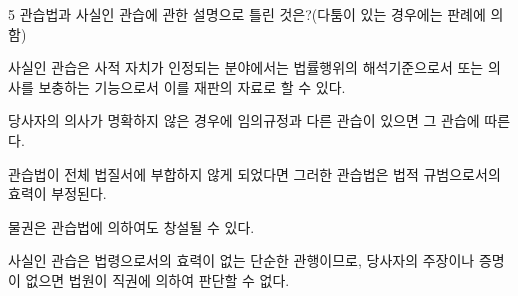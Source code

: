 \begin{question}{5}
관습법과 사실인 관습에 관한 설명으로 틀린 것은?(다툼이 있는 경우에는 판례에 의함)
\begin{choices}
  \item 사실인 관습은 사적 자치가 인정되는 분야에서는 법률행위의 해석기준으로서 또는 의사를 보충하는 기능으로서 이를 재판의 자료로 할 수 있다.
  \item 당사자의 의사가 명확하지 않은 경우에 임의규정과 다른 관습이 있으면 그 관습에 따른다.
  \item 관습법이 전체 법질서에 부합하지 않게 되었다면 그러한 관습법은 법적 규범으로서의 효력이 부정된다.
  \item 물권은 관습법에 의하여도 창설될 수 있다.
  \item 사실인 관습은 법령으로서의 효력이 없는 단순한 관행이므로, 당사자의 주장이나 증명이 없으면 법원이 직권에 의하여 판단할 수 없다.
\end{choices}
\end{question}
